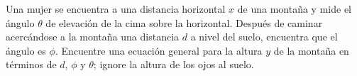 \item Una mujer se encuentra a una distancia horizontal $x$ de una montaña y mide el ángulo $\theta$ de elevación de la cima sobre la horizontal. Después de caminar acercándose a la montaña una distancia $d$ a nivel del suelo, encuentra que el ángulo es $\phi$. Encuentre una ecuación general para la altura $y$ de la montaña en términos de $d$, $\phi$ y $\theta$; ignore la altura de los ojos al suelo.
